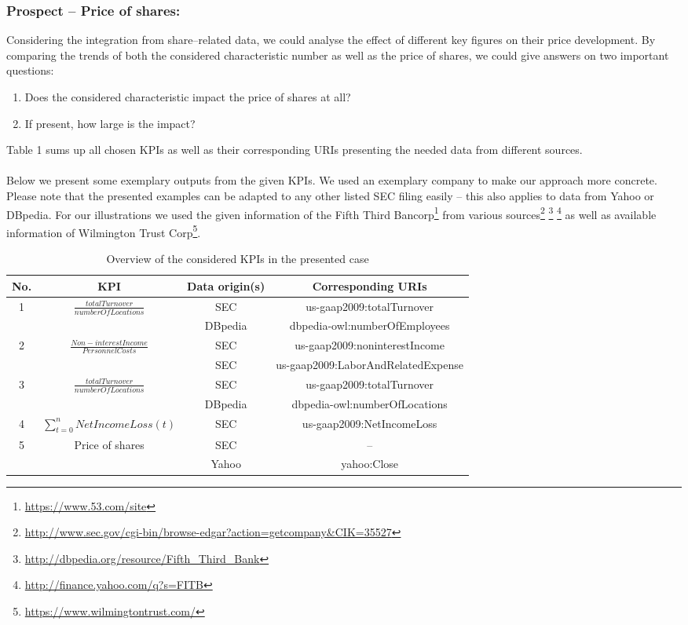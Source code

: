 \documentclass[runningheads]{llncs}
\begin{document}
\subsubsection{Prospect -- Price of shares:}
Considering the integration from share--related data, we could analyse the effect of different key figures on their price development. By comparing the trends of both the considered characteristic number as well as the price of shares, we could give answers on two important questions:
\begin{enumerate}
\item Does the considered characteristic impact the price of shares at all?
\item If present, how large is the impact?
\end{enumerate}
Table 1 sums up all chosen KPIs as well as their corresponding URIs presenting the needed data from different sources. \\ \\
Below we present some exemplary outputs from the given KPIs. We used an exemplary company to make our approach more concrete. Please note that the presented examples can be adapted to any other listed SEC filing easily -- this also applies to data from Yahoo or DBpedia. For our illustrations we used the given information of the Fifth Third Bancorp\footnote{\url{https://www.53.com/site}} from various sources\footnote{\url{http://www.sec.gov/cgi-bin/browse-edgar?action=getcompany&CIK=35527}} \footnote{\url{http://dbpedia.org/resource/Fifth_Third_Bank}} \footnote{\url{http://finance.yahoo.com/q?s=FITB}} as well as available information of Wilmington Trust Corp\footnote{\url{https://www.wilmingtontrust.com/}}.
\begin{table}[!h]
\begin{tabular}{|c|c|c|c|}
\hline
\textbf{No.} & \textbf{KPI} & \textbf{Data origin(s)} & \textbf{Corresponding URIs} \\
\hline
\hline
\multirow{2}{*}{1} & \multirow{2}{*}{ $\frac{totalTurnover}{numberOfLocations}$} & SEC & us-gaap2009:totalTurnover\\
 & & DBpedia & dbpedia-owl:numberOfEmployees\\
\hline
\multirow{2}{*}{2} & \multirow{2}{*}{ $\frac{Non-interestIncome}{PersonnelCosts}$ } & SEC & us-gaap2009:noninterestIncome\\
 & & SEC & us-gaap2009:LaborAndRelatedExpense\\
\hline
\multirow{2}{*}{3} & \multirow{2}{*}{ $\frac{totalTurnover}{numberOfLocations}$} & SEC & us-gaap2009:totalTurnover\\
 & & DBpedia & dbpedia-owl:numberOfLocations\\
\hline
4 & $\sum_{t=0}^{n}NetIncomeLoss(t)$ & SEC & us-gaap2009:NetIncomeLoss \\ 
\hline
\multirow{2}{*}{5} & \multirow{2}{*}{Price of shares} & SEC & -- \\
 & & Yahoo &yahoo:Close\\
\hline
\end{tabular}
\label{table1}
\caption{Overview of the considered KPIs in the presented case}
\end{table}
\end{document}
